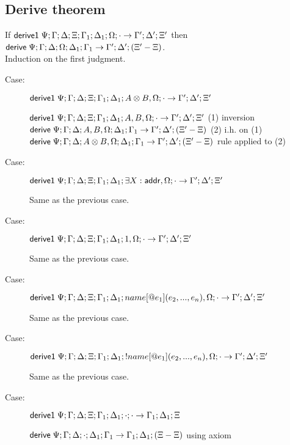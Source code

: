\documentclass[9pt]{article}
\begin{document}
\subsection{Derive theorem}

If $\mathsf{derive1} \; \Psi; \Gamma; \Delta; \Xi; \Gamma_1 ; \Delta_1; \Omega ; \cdot \rightarrow \Gamma' ; \Delta' ; \Xi'$ then $\mathsf{derive} \; \Psi ; \Gamma ; \Delta; \Omega; \Delta_1; \Gamma_1 \rightarrow \Gamma'; \Delta'; (\Xi' - \Xi)$. \\

Induction on the first judgment.

\begin{description}
\item[Case:] $\mathsf{derive1} \; \Psi ; \Gamma; \Delta; \Xi; \Gamma_1 ; \Delta_1 ; A \otimes B, \Omega ; \cdot \rightarrow \Gamma' ; \Delta' ; \Xi'$

$\mathsf{derive1} \; \Psi ; \Gamma ; \Delta; \Xi; \Gamma_1; \Delta_1 ; A, B, \Omega ; \cdot \rightarrow \Gamma' ; \Delta' ; \Xi'$ \hfill (1) inversion \\
$\mathsf{derive} \; \Psi ; \Gamma ; \Delta ; A, B, \Omega ; \Delta_1 ; \Gamma_1 \rightarrow \Gamma'; \Delta'; (\Xi' - \Xi)$ \hfill (2) i.h. on (1) \\
$\mathsf{derive} \; \Psi ; \Gamma ; \Delta ; A \otimes B, \Omega ; \Delta_1 ; \Gamma_1 \rightarrow \Gamma'; \Delta' ; (\Xi' - \Xi)$ \hfill rule applied to (2) \\

\item[Case:] $\mathsf{derive1} \; \Psi ; \Gamma ; \Delta; \Xi; \Gamma_1 ; \Delta_1; \exists X:\mathsf{addr}, \Omega; \cdot \rightarrow \Gamma'; \Delta' ; \Xi'$

Same as the previous case.

\item[Case:] $\mathsf{derive1} \; \Psi ; \Gamma ; \Delta; \Xi; \Gamma_1 ; \Delta_1; 1, \Omega; \cdot \rightarrow \Gamma'; \Delta' ; \Xi'$

Same as the previous case.

\item[Case:] $\mathsf{derive1} \; \Psi ; \Gamma ; \Delta; \Xi; \Gamma_1 ; \Delta_1; name[@e_1](e_2, ..., e_n), \Omega; \cdot \rightarrow \Gamma'; \Delta' ; \Xi'$

Same as the previous case.

\item[Case:] $\mathsf{derive1} \; \Psi ; \Gamma ; \Delta; \Xi; \Gamma_1 ; \Delta_1; {!}name[@e_1](e_2, ..., e_n), \Omega; \cdot \rightarrow \Gamma'; \Delta' ; \Xi'$

Same as the previous case.

\item[Case:] $\mathsf{derive1} \; \Psi ; \Gamma; \Delta ; \Xi; \Gamma_1; \Delta_1 ; \cdot ; \cdot \rightarrow \Gamma_1; \Delta_1; \Xi$

$\mathsf{derive} \; \Psi; \Gamma; \Delta; \cdot ; \Delta_1; \Gamma_1 \rightarrow \Gamma_1; \Delta_1; (\Xi - \Xi)$ \hfill using axiom \\


\end{description}
\end{document}
